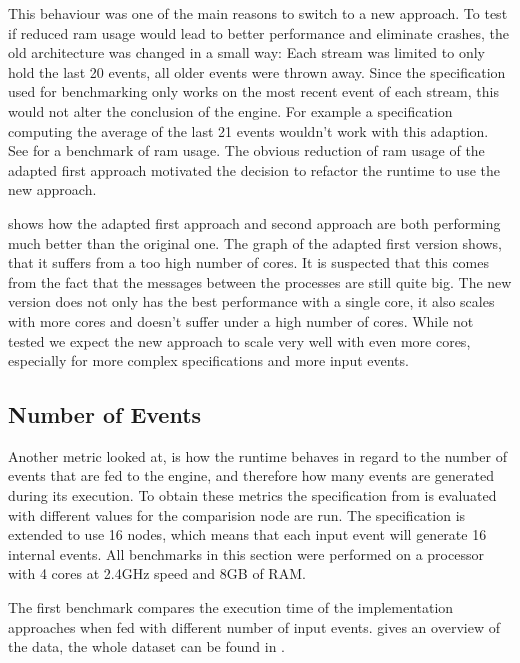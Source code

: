 This behaviour was one of the main reasons to switch to a new approach.
To test if reduced \gls{ram} usage would lead to better performance and eliminate crashes, the old architecture was changed in a small way: Each stream was limited to only hold the last 20 events, all older events were thrown away.
Since the specification used for benchmarking only works on the most recent event of each stream, this would not alter the conclusion of the engine.
For example a specification computing the average of the last 21 events wouldn't work with this adaption.
See  for a benchmark of \gls{ram} usage.
The obvious reduction of \gls{ram} usage of the adapted first approach motivated the decision to refactor the runtime to use the new approach.

 shows how the adapted first approach and second approach are both performing much better than the original one.
The graph of the adapted first version shows, that it suffers from a too high number of cores.
It is suspected that this comes from the fact that the messages between the processes are still quite big.
The new version does not only has the best performance with a single core, it also scales with more cores and doesn't suffer under a high number of cores.
While not tested we expect the new approach to scale very well with even more cores, especially for more complex specifications and more input events.

\subsection{Number of Events}
\label{sec:evaluation:runtime_benchmarks:num_events}

Another metric looked at, is how the runtime behaves in regard to the number of events that are fed to the engine, and therefore how many events are generated during its execution.
To obtain these metrics the specification from  is evaluated with different values for the comparision node are run.
The specification is extended to use 16 nodes, which means that each input event will generate 16 internal events.
All benchmarks in this section were performed on a processor with 4 cores at 2.4GHz speed and 8GB of RAM.

The first benchmark compares the execution time of the implementation approaches when fed with different number of input events.
 gives an overview of the data, the whole dataset can be found in .

